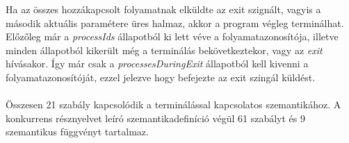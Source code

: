 

Ha az összes hozzákapcsolt folyamatnak elküldte az exit szignált, vagyis a második aktuális paramétere üres halmaz, akkor a program végleg terminálhat. Előzőleg már a \textit{processIds} állapotból ki lett véve a folyamatazonosítója, illetve minden állapotból kikerült még a terminálás bekövetkeztekor, vagy az \textit{exit} hívásakor. Így már csak a \textit{processesDuringExit} állapotból kell kivenni a folyamatazonosítóját, ezzel jelezve hogy befejezte az exit szingál küldést.

\paragraph{}
Összesen 21 szabály kapcsolódik a terminálással kapcsolatos szemantikához. A konkurrens résznyelvet leíró szemantikadefiníció végül 61 szabályt és 9 szemantikus függvényt tartalmaz.



